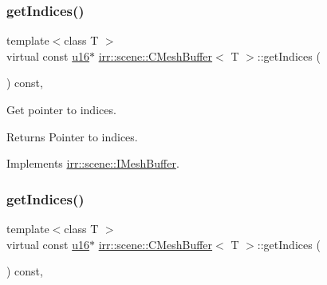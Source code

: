 \subsubsection{\texorpdfstring{get\+Indices()}{getIndices()}\hspace{0.1cm}{\footnotesize\ttfamily [1/4]}}
{\footnotesize\ttfamily template$<$class T $>$ \\
virtual const \hyperlink{namespaceirr_ae9f8ec82692ad3b83c21f555bfa70bcc}{u16}$\ast$ \hyperlink{classirr_1_1scene_1_1CMeshBuffer}{irr\+::scene\+::\+C\+Mesh\+Buffer}$<$ T $>$\+::get\+Indices (\begin{DoxyParamCaption}{ }\end{DoxyParamCaption}) const\hspace{0.3cm}{\ttfamily [inline]}, {\ttfamily [virtual]}}



Get pointer to indices. 

\begin{DoxyReturn}{Returns}
Pointer to indices. 
\end{DoxyReturn}


Implements \hyperlink{classirr_1_1scene_1_1IMeshBuffer_a76c0013378012af7aeb6cb8f4ea8f9a1}{irr\+::scene\+::\+I\+Mesh\+Buffer}.

\mbox{\label{classirr_1_1scene_1_1CMeshBuffer_a23af7e8ffb2ba674d1dd4448cea288bf}} 
\subsubsection{\texorpdfstring{get\+Indices()}{getIndices()}\hspace{0.1cm}{\footnotesize\ttfamily [2/4]}}
{\footnotesize\ttfamily template$<$class T $>$ \\
virtual const \hyperlink{namespaceirr_ae9f8ec82692ad3b83c21f555bfa70bcc}{u16}$\ast$ \hyperlink{classirr_1_1scene_1_1CMeshBuffer}{irr\+::scene\+::\+C\+Mesh\+Buffer}$<$ T $>$\+::get\+Indices (\begin{DoxyParamCaption}{ }\end{DoxyParamCaption}) const\hspace{0.3cm}{\ttfamily [inline]}, {\ttfamily [virtual]}}



